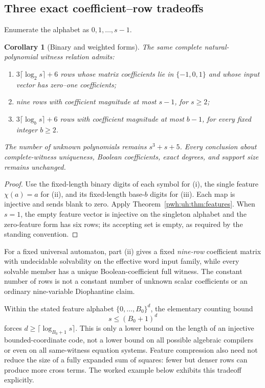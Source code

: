 \documentclass[11pt,letterpaper]{article}
\numberwithin{equation}{section}
\newtheorem{corollary}[theorem]{Corollary}
\theoremstyle{definition}
\begin{document}
\subsection{Three exact coefficient--row tradeoffs}

Enumerate the alphabet as $0,1,\ldots,s-1$.
\begin{corollary}[Binary and weighted forms]
\label{pwh:uh:cor:feature-counts}
The same complete natural-polynomial witness relation admits:
\begin{enumerate}[label=\textup{(\roman*)}]
\item $3\lceil\log_2s\rceil+6$ rows whose matrix coefficients lie in
      $\{-1,0,1\}$ and whose input vector has zero--one coefficients;
\item nine rows with coefficient magnitude at most $s-1$, for $s\ge2$;
\item $3\lceil\log_b s\rceil+6$ rows with coefficient magnitude at most
      $b-1$, for every fixed integer $b\ge2$.
\end{enumerate}
The number of unknown polynomials remains $s^3+s+5$. Every conclusion
about complete-witness uniqueness, Boolean coefficients, exact degrees,
and support size remains unchanged.
\end{corollary}

\begin{proof}
Use the fixed-length binary digits of each symbol for (i), the single
feature $\chi(a)=a$ for (ii), and its fixed-length base-$b$ digits for
(iii). Each map is injective and sends blank to zero. Apply
Theorem~\ref{pwh:uh:thm:features}. When $s=1$, the empty feature vector is
injective on the singleton alphabet and the zero-feature form has six
rows; its accepting set is empty, as required by the standing convention.
\end{proof}

For a fixed universal automaton, part (ii) gives a fixed \emph{nine-row}
coefficient matrix with undecidable solvability on the effective word
input family, while every solvable member has a unique Boolean-coefficient
full witness. The constant number of rows is not a constant number of
unknown scalar coefficients or an ordinary nine-variable Diophantine
claim.

Within the stated feature alphabet $\{0,\ldots,B_0\}^d$, the elementary
counting bound
\[
 s\le(B_0+1)^d
\]
forces $d\ge\lceil\log_{B_0+1}s\rceil$. This is only a lower bound on the
length of an injective bounded-coordinate code, not a lower bound on all
possible algebraic compilers or even on all same-witness equation systems.
Feature compression also need not reduce the size of a fully expanded
sum of squares: fewer but denser rows can produce more cross terms. The
worked example below exhibits this tradeoff explicitly.
\end{document}
